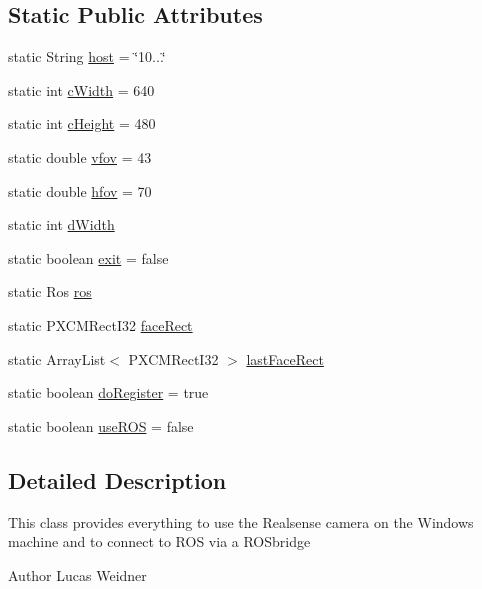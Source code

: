 \subsection*{Static Public Attributes}
\begin{DoxyCompactItemize}
\item 
static String \hyperlink{class_camera_viewer_ae3aa04f2442f86d016ac36ec1826f602}{host} = \char`\"{}10...\char`\"{}
\item 
static int \hyperlink{class_camera_viewer_a8d9edb173e94f793e357f75110536d2a}{c\+Width} = 640
\item 
static int \hyperlink{class_camera_viewer_af02b7d67aab1dc9cabf2a878fb8a0f85}{c\+Height} = 480
\item 
static double \hyperlink{class_camera_viewer_a767dac9c7706ba964760627c663196be}{vfov} = 43
\item 
static double \hyperlink{class_camera_viewer_acc21e91b5db8c8166f18507a357210b3}{hfov} = 70
\item 
static int \hyperlink{class_camera_viewer_aded50825f5d1ea9c745c75a55e4a105d}{d\+Width}
\item 
static boolean \hyperlink{class_camera_viewer_a1de16e85ab6c251bb6af54bdecf99f03}{exit} = false
\item 
static Ros \hyperlink{class_camera_viewer_a03084cede72b21c8d4c3be7653f0ea9d}{ros}
\item 
static P\+X\+C\+M\+Rect\+I32 \hyperlink{class_camera_viewer_a9fd124ff0771b5037aebfac55a49cc74}{face\+Rect}
\item 
static Array\+List$<$ P\+X\+C\+M\+Rect\+I32 $>$ \hyperlink{class_camera_viewer_a4bc05c51ad1bc21023c7a8b5faf2edc6}{last\+Face\+Rect}
\item 
static boolean \hyperlink{class_camera_viewer_a5435323d8b24dad1767ef81de2a72d60}{do\+Register} = true
\item 
static boolean \hyperlink{class_camera_viewer_a5925c6ab3f43232f9c4e1a2e5c4b2623}{use\+R\+OS} = false
\end{DoxyCompactItemize}


\subsection{Detailed Description}
This class provides everything to use the Realsense camera on the Windows machine and to connect to R\+OS via a R\+O\+Sbridge \begin{DoxyAuthor}{Author}
Lucas Weidner 
\end{DoxyAuthor}


